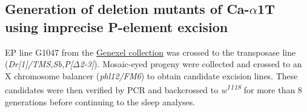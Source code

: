 \subsection*{Generation of deletion mutants of Ca-$\alpha$1T using imprecise P-element excision}

EP line G1047 from the \href{http://genexel.kaist.ac.kr}{Genexel collection} was crossed to the transposase line (\emph{Dr[1]/TMS,Sb,P[$\Delta$2-3]}). Mosaic-eyed progeny were collected and crossed to an X chromosome balancer (\emph{phl12/FM6}) to obtain candidate excision lines. These candidates were then verified by PCR and backcrossed to \emph{w\textsuperscript{1118}} for more than 8 generations before continuing to the sleep analyses.
